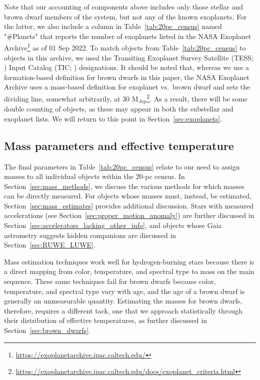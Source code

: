 \documentclass[twocolumn,tighten,twocolappendix]{aastex631}
\begin{document}
Note that our accounting of components above includes only those stellar and brown dwarf members of the system, but not any of the known exoplanets. For the latter, we also include a column in Table~\ref{tab:20pc_census} named "\#Planets" that reports the number of exoplanets listed in the NASA Exoplanet Archive\footnote{\url {https://exoplanetarchive.ipac.caltech.edu/}} as of 01 Sep 2022. To match objects from Table~\ref{tab:20pc_census} to objects in this archive, we used the Transiting Exoplanet Survey Satellite (TESS; \citealt{ricker2015}) Input Catalog (TIC; \citealt{stassun2019}) designations. It should be noted that, whereas we use a formation-based definition for brown dwarfs in this paper, the NASA Exoplanet Archive uses a mass-based definition for exoplanet vs.\ brown dwarf and sets the dividing line, somewhat arbitrarily, at 30 M$_{Jup}$\footnote{\url {https://exoplanetarchive.ipac.caltech.edu/docs/exoplanet\_criteria.html}}. As a result, there will be some double counting of objects, as these may appear in both the substellar and exoplanet lists. We will return to this point in Section~\ref{sec:exoplanets}. 


\subsection{Mass parameters and effective temperature}

The final parameters in Table~\ref{tab:20pc_census} relate to our need to assign masses to all individual objects within the 20-pc census. In Section~\ref{sec:mass_methods}, we discuss the various methods for which masses can be directly measured. For objects whose masses must, instead, be estimated, Section~\ref{sec:mass_estimates} provides additional discussion. Stars with measured accelerations (see Section~\ref{sec:proper_motion_anomaly}) are further discussed in Section~\ref{sec:accelerators_lacking_other_info}, and objects whose Gaia astrometry suggests hidden companions are discussed in Section~\ref{sec:RUWE_LUWE}. 

Mass estimation techniques work well for hydrogen-burning stars because there is a direct mapping from color, temperature, and spectral type to mass on the main sequence. These same techniques fail for brown dwarfs because color, temperature, and spectral type vary with age, and the age of a brown dwarf is generally an unmeasurable quantity. Estimating the masses for brown dwarfs, therefore, requires a different tack, one that we approach statistically through their distribution of effective temperatures, as further discussed in Section~\ref{sec:brown_dwarfs}. 
\end{document}

